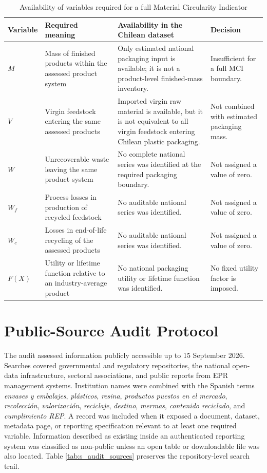 \documentclass[review,10pt]{elsarticle}
\begin{document}
\begin{longtable}{|L{2.0cm}|L{4.3cm}|L{4.0cm}|L{5.0cm}|}
\caption{Availability of variables required for a full Material Circularity Indicator}
\label{tab:s_mci}\\
\hline
\textbf{Variable} & \textbf{Required meaning} & \textbf{Availability in the Chilean dataset} & \textbf{Decision} \\
\hline
\endfirsthead
\hline
$M$ & Mass of finished products within the assessed product system & Only estimated national packaging input is available; it is not a product-level finished-mass inventory. & Insufficient for a full MCI boundary. \\
\hline
$V$ & Virgin feedstock entering the same assessed products & Imported virgin raw material is available, but it is not equivalent to all virgin feedstock entering Chilean plastic packaging. & Not combined with estimated packaging mass. \\
\hline
$W$ & Unrecoverable waste leaving the same product system & No complete national series was identified at the required packaging boundary. & Not assigned a value of zero. \\
\hline
$W_f$ & Process losses in production of recycled feedstock & No auditable national series was identified. & Not assigned a value of zero. \\
\hline
$W_c$ & Losses in end-of-life recycling of the assessed products & No auditable national series was identified. & Not assigned a value of zero. \\
\hline
$F(X)$ & Utility or lifetime function relative to an industry-average product & No national packaging utility or lifetime function was identified. & No fixed utility factor is imposed. \\
\hline
\end{longtable}

\section{Public-Source Audit Protocol}

The audit assessed information publicly accessible up to 15 September 2026. Searches covered governmental and regulatory repositories, the national open-data infrastructure, sectoral associations, and public reports from EPR management systems. Institution names were combined with the Spanish terms \textit{envases y embalajes}, \textit{plásticos}, \textit{resina}, \textit{productos puestos en el mercado}, \textit{recolección}, \textit{valorización}, \textit{reciclaje}, \textit{destino}, \textit{mermas}, \textit{contenido reciclado}, and \textit{cumplimiento REP}. A record was included when it exposed a document, dataset, metadata page, or reporting specification relevant to at least one required variable. Information described as existing inside an authenticated reporting system was classified as non-public unless an open table or downloadable file was also located. Table \ref{tab:s_audit_sources} preserves the repository-level search trail.
\end{document}
